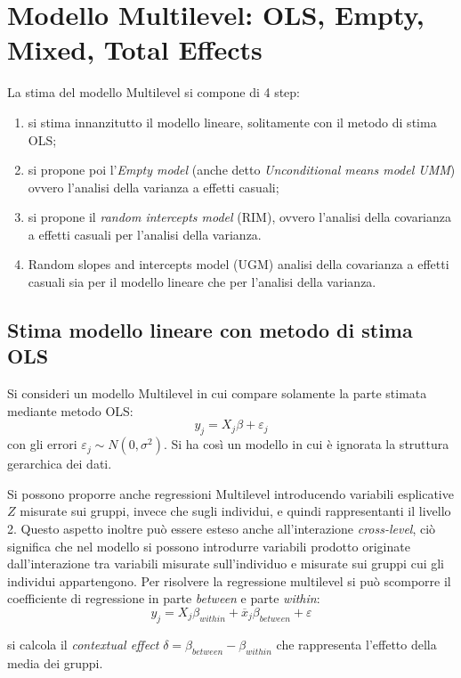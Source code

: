 \documentclass[a4page, 11pt]{article} %
\begin{document}
\section{Modello Multilevel: OLS, Empty, Mixed, Total Effects}
La stima del modello Multilevel si compone di 4 step:
\begin{enumerate}[noitemsep]
\item si stima innanzitutto il modello lineare, solitamente con il metodo di stima OLS;
\item si propone poi l'\textit{Empty model} (anche detto \textit{Unconditional means model UMM}) ovvero l’analisi della varianza a effetti casuali;
\item si propone il \textit{random intercepts model} (RIM), ovvero l’analisi della covarianza a effetti casuali per l’analisi della varianza.
\item Random slopes and intercepts model (UGM) analisi della covarianza a effetti casuali sia per il modello lineare che per l’analisi della varianza.
\end{enumerate}

\subsection*{Stima modello lineare con metodo di stima OLS}
Si consideri un modello Multilevel in cui compare solamente la parte stimata mediante metodo OLS:
\begin{equation*}
  y_j = X_j \beta + \varepsilon_j
\end{equation*}
con gli errori $\varepsilon_j \sim N(0, \sigma^2)$.
Si ha così un modello in cui è ignorata la struttura gerarchica dei dati.

Si possono proporre anche regressioni Multilevel introducendo variabili esplicative $Z$ misurate sui gruppi, invece che sugli individui, e quindi rappresentanti il livello 2.
Questo aspetto inoltre può essere esteso anche all'interazione \textit{cross-level}, ciò significa che nel modello si possono introdurre variabili prodotto originate dall'interazione tra variabili misurate sull'individuo e misurate sui gruppi cui gli individui appartengono.
Per risolvere la regressione multilevel si può scomporre il coefficiente di regressione in parte \textit{between} e parte \textit{within}: 
\begin{equation*}
y_j = X_j \beta_{within} +\overline{x}_j\beta_{between} +\varepsilon
\end{equation*}

si calcola il \textit{contextual effect} $\delta = \beta_{between} - \beta_{within}$ che rappresenta l'effetto della media dei gruppi.
\end{document}
